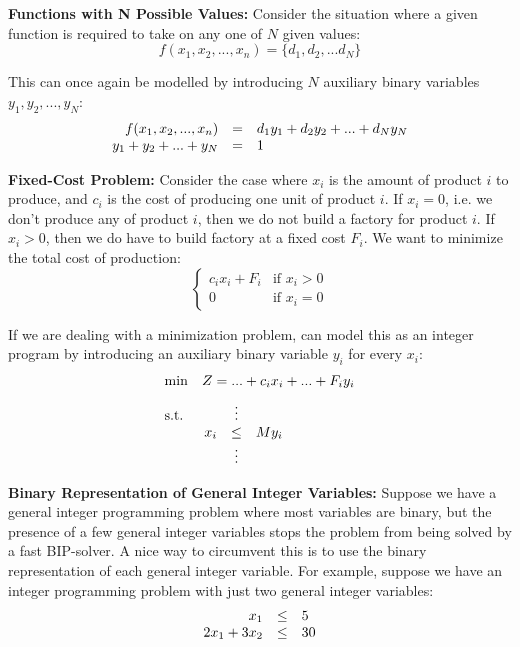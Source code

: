 \documentclass[12pt]{article}
\begin{document}
\noindent
\textbf{Functions with N Possible Values:}
Consider the situation where a given function is required to take on any one of $N$ given values:
\[ f(x_1, x_2, ... , x_n) = \{ d_1, d_2, ... d_N \} \]

\noindent
This can once again be modelled by introducing $N$ auxiliary binary variables $y_1, y_2, ... , y_N$:
\begin{align*}
    \begin{array}[t]{r c l}
        f(x_1, x_2, ... , x_n) & = & d_1y_1 + d_2y_2 + ... + d_Ny_N \\
        y_1 + y_2 + ... + y_N & = & 1
     \end{array}
\end{align*}

\noindent
\textbf{Fixed-Cost Problem:}
Consider the case where $x_i$ is the amount of product $i$ to produce, and $c_i$ is the cost of producing one unit of product $i$.
If $x_i = 0$, i.e. we don't produce any of product $i$, then we do not build a factory for product $i$.
If $x_i > 0$, then we do have to build factory at a fixed cost $F_i$.
We want to minimize the total cost of production:
\begin{equation*}
    \begin{cases}
        c_ix_i + F_i & \text{if } x_i > 0\\
        0 & \text{if } x_i = 0
    \end{cases}       
\end{equation*}

\noindent
If we are dealing with a minimization problem, can model this as an integer program by introducing an auxiliary binary variable $y_i$ for every $x_i$:
\begin{align*}
    &\mathrm{min} \quad Z = ... + c_ix_i + ... + F_iy_i \\[2pt]
    &\mathrm{s.t.} \quad 
    \begin{array}[t]{r c l}
        & \vdots & \\
        x_i & \leq & My_i \\
        & \vdots &
     \end{array}
\end{align*}

\newpage
\noindent
\textbf{Binary Representation of General Integer Variables:}
Suppose we have a general integer programming problem where most variables are binary, but the presence of a few general integer variables stops the problem from being solved by a fast BIP-solver.
A nice way to circumvent this is to use the binary representation of each general integer variable.
For example, suppose we have an integer programming problem with just two general integer variables:
\begin{align*}
    \begin{array}[t]{r c l}
        x_1 & \leq & 5 \\
        2x_1 + 3x_2 & \leq & 30
     \end{array}
\end{align*}
\end{document}
